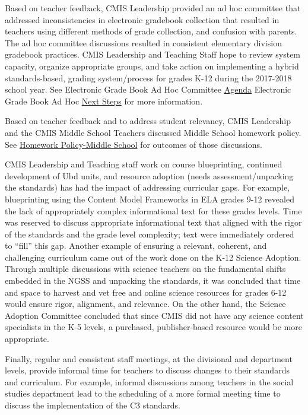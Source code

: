 \begin{findings}
Based on teacher feedback, CMIS Leadership provided an ad hoc committee that addressed inconsistencies in electronic gradebook collection that resulted in teachers using different methods of grade collection, and confusion with parents. The ad hoc committee discussions resulted in consistent elementary division gradebook practices. CMIS Leadership and Teaching Staff hope to review system capacity, organize appropriate groups, and take action on implementing a hybrid standards-based, grading system/process for grades K-12 during the 2017-2018 school year. See Electronic Grade Book Ad Hoc Committee \href{https://docs.google.com/a/cmis.ac.th/document/d/1Zj6EgudBwl-ifOguUDN-bHM8avJbFEZEFGwERJfVRbk/edit?usp=sharing}{Agenda}  Electronic Grade Book Ad Hoc \href{https://docs.google.com/a/cmis.ac.th/document/d/1087Xf0H6-vlwR7qYB2zhzWwBThQR4PQKffTVP3CaEis/edit?usp=sharing}{Next Steps} for more information. 

Based on teacher feedback and to address student relevancy, CMIS Leadership and the CMIS Middle School Teachers discussed Middle School homework policy. See \href{https://docs.google.com/a/cmis.ac.th/document/d/16b9QZYYXoRK-nJdFtCsW13NB9IwzAu8rlmTMnJ6usdo/edit?usp=sharing}{Homework Policy-Middle School} for outcomes of those discussions. 

CMIS Leadership and Teaching staff work on course blueprinting, continued development of Ubd units, and resource adoption (needs assessment/unpacking the standards) has had the impact of addressing curricular gaps. For example, blueprinting using the Content Model Frameworks in ELA grades 9-12 revealed the lack of appropriately complex informational text for these grades levels. Time was reserved to discuss appropriate informational text that aligned with the rigor of the standards and the grade level complexity; text were immediately ordered to “fill” this gap. Another example of ensuring a relevant, coherent, and challenging curriculum came out of the work done on the K-12 Science Adoption. Through multiple discussions with science teachers on the fundamental shifts embedded in the NGSS and unpacking the standards, it was concluded that time and space to harvest and vet free and online science resources for grades 6-12 would ensure rigor, alignment, and relevance. On the other hand, the Science Adoption Committee concluded that since CMIS did not have any science content specialists in the K-5 levels, a purchased, publisher-based resource would be more appropriate. 

Finally, regular and consistent staff meetings, at the divisional and department levels, provide informal time for teachers to discuss changes to their standards and curriculum. For example, informal discussions among teachers in the social studies department lead to the scheduling of a more formal meeting time to discuss the implementation of the C3 standards.


\end{findings}
